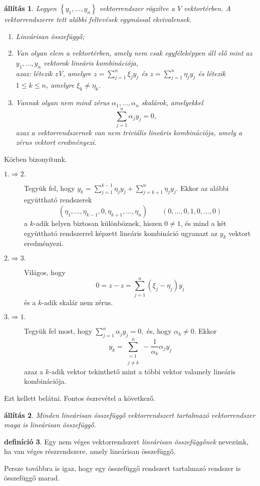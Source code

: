 \documentclass[a4paper, showtrims]{memoir}
\makeatletter
\renewenvironment{proof}[1][\proofname]
    {\par\pushQED{\qed}%
    \normalfont \topsep6\p@\@plus6\p@\relax
    \trivlist
    \item[\hskip\labelsep
        \itshape
    #1\@addpunct{:}]\ignorespaces}
    {\popQED\endtrivlist\@endpefalse}
\theoremstyle{plain}
\newtheorem{proposition}{állítás}[chapter]
\theoremstyle{remark}
\theoremstyle{definition}
\newtheorem{definition}[proposition]{definíció}
\makeatother
\begin{document}
\begin{proposition}
	Legyen $\left\{ y_1,\ldots,y_n \right\}$ vektorrendszer rögzítve a $V$ vektortérben.
	A vektorrendszerre tett alábbi feltevések egymással ekvivalensek.
	\begin{enumerate}
		\item Lineárisan összefüggő;
		\item Van olyan elem a vektortérben, amely nem csak egyféleképpen áll elő mint az $y_1,\ldots,y_n$
		      vektorok lineáris kombinációja,\\
		      azaz:
		      létezik z\in V, amelyre $z=\sum_{j=1}^n\xi_jy_j$ és $z=\sum_{j=1}^n\eta_jy_j$
		      és létezik $1\leq k\leq n$, amelyre $\xi_k\neq\eta_k$.
		\item Vannak olyan nem mind zérus $\alpha_1,\ldots,\alpha_n$ skalárok, amelyekkel
		      \[
			      \sum_{j=1}^n\alpha_jy_j=0,
		      \]
              azaz a vektorrendszernek van nem triviális lineáris kombinációja, amely a zérus vektort eredményezi.
              \qedhere
	\end{enumerate}
\end{proposition}
\begin{proof}
	Körben bizonyítunk.
	\begin{description}
		\item[$1.\Rightarrow 2.$]
		      Tegyük fel, hogy $y_k=\sum_{j=1}^{k-1}\eta_jy_j+\sum_{j=k+1}^n\eta_jy_j$.
		      Ekkor az alábbi együttható rendszerek
		      \[
			      \left( \eta_1,\ldots,\eta_{k-1},0,\eta_{k+1},\ldots,\eta_n \right)
			      \qquad
			      \left( 0,\ldots,0,1,0,\ldots,0 \right)
		      \]
		      a $k$-adik helyen biztosan különböznek,
		      hiszen $0\neq 1$,
		      és mind a két együttható rendszerrel képzett lineáris kombináció ugyanazt az $y_k$ vektort eredményezi.
		\item[$2.\Rightarrow 3.$]
		      Világos, hogy
		      \[
			      0=z-z=
			      \sum_{j=1}^n\left( \xi_j-\eta_j \right)y_j
		      \]
		      és a $k$-adik skalár nem zérus.
		\item[$3.\Rightarrow 1.$]
		      Tegyük fel most, hogy
		      \(
		      \sum_{j=1}^n\alpha_jy_j=0,
		      \)
		      és, hogy $\alpha_k\neq 0.$
		      Ekkor
		      \[
			      y_k=\sum_{\substack{=1\\j\neq k}}^n-\frac{1}{\alpha_k}\alpha_jy_j
		      \]
		      azaz a $k$-adik vektor tekinthető mint a többi vektor valamely lineáris kombinációja.
	\end{description}
	Ezt kellett belátni.
\end{proof}
Fontos észrevétel a következő.
\begin{proposition}
	Minden lineárisan összefüggő vektorrendszert tartalmazó vektorrendszer maga is lineárisan összefüggő.
\end{proposition}
\begin{definition}
    Egy nem véges vektorrendszert \emph{lineárisan összefüggőnek} nevezünk,
	ha van véges részrendszere, amely lineárisan összefüggő.
\end{definition}
Persze továbbra is igaz, hogy egy összefüggő rendszert tartalmazó rendszer is összefüggő marad.
\end{document}

